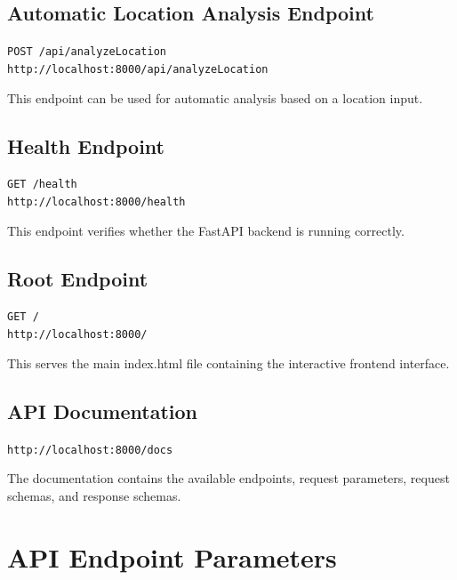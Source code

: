 \documentclass[12pt,a4paper]{article}
\begin{document}
\subsection{Automatic Location Analysis Endpoint}

\begin{center}
\texttt{POST /api/analyzeLocation} \\
\texttt{http://localhost:8000/api/analyzeLocation}
\end{center}

This endpoint can be used for automatic analysis based on a location input.

\subsection{Health Endpoint}

\begin{center}
\texttt{GET /health} \\
\texttt{http://localhost:8000/health}
\end{center}

This endpoint verifies whether the FastAPI backend is running correctly.

\subsection{Root Endpoint}

\begin{center}
\texttt{GET /} \\
\texttt{http://localhost:8000/}
\end{center}

This serves the main index.html file containing the interactive frontend interface.

\subsection{API Documentation}

\begin{center}
\texttt{http://localhost:8000/docs}
\end{center}

The documentation contains the available endpoints, request parameters, request
schemas, and response schemas.

\section{API Endpoint Parameters}
\end{document}

